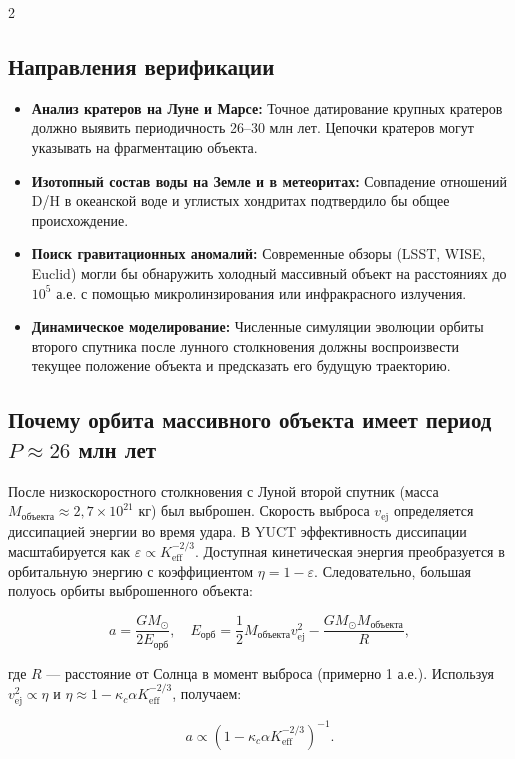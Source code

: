 \documentclass[11pt,a4paper]{article}
\begin{document}
\begin{multicols}{2}
		\subsection{Направления верификации}
		
		\begin{itemize}
			\item \textbf{Анализ кратеров на Луне и Марсе:} Точное датирование крупных кратеров должно выявить периодичность 26–30 млн лет. Цепочки кратеров могут указывать на фрагментацию объекта.
			\item \textbf{Изотопный состав воды на Земле и в метеоритах:} Совпадение отношений D/H в океанской воде и углистых хондритах подтвердило бы общее происхождение.
			\item \textbf{Поиск гравитационных аномалий:} Современные обзоры (LSST, WISE, Euclid) могли бы обнаружить холодный массивный объект на расстояниях до \(10^5\) а.е. с помощью микролинзирования или инфракрасного излучения.
			\item \textbf{Динамическое моделирование:} Численные симуляции эволюции орбиты второго спутника после лунного столкновения должны воспроизвести текущее положение объекта и предсказать его будущую траекторию.
		\end{itemize}
		
		\subsection{Почему орбита массивного объекта имеет период \(P \approx 26\) млн лет}
		
		После низкоскоростного столкновения с Луной второй спутник (масса $M_{\text{объекта}} \approx 2,7\times10^{21}$ кг) был выброшен. Скорость выброса $v_{\text{ej}}$ определяется диссипацией энергии во время удара. В YUCT эффективность диссипации масштабируется как $\varepsilon \propto K_{\mathrm{eff}}^{-2/3}$. Доступная кинетическая энергия преобразуется в орбитальную энергию с коэффициентом $\eta = 1 - \varepsilon$. Следовательно, большая полуось орбиты выброшенного объекта:
		
		\[
		a = \frac{GM_{\odot}}{2E_{\text{орб}}}, \quad E_{\text{орб}} = \frac{1}{2} M_{\text{объекта}} v_{\text{ej}}^2 - \frac{GM_{\odot}M_{\text{объекта}}}{R},
		\]
		
		где $R$ — расстояние от Солнца в момент выброса (примерно 1 а.е.). Используя $v_{\text{ej}}^2 \propto \eta$ и $\eta \approx 1 - \kappa_c \alpha K_{\mathrm{eff}}^{-2/3}$, получаем:
		
		\[
		a \propto \left(1 - \kappa_c \alpha K_{\mathrm{eff}}^{-2/3}\right)^{-1}.
		\]
		

\end{multicols}
\end{document}
